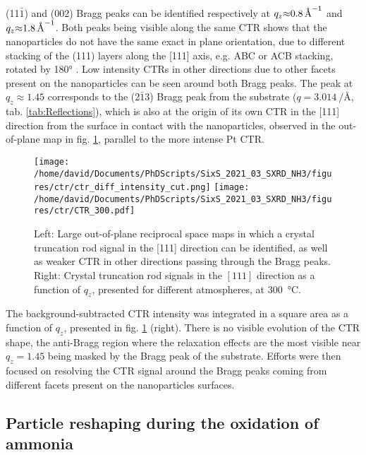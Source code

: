(11$\bar{1}$) and (002) Bragg peaks can be identified respectively at $q_z \qty{\approx0.8}{\per\angstrom}$ and $q_z \qty{\approx1.8}{\per\angstrom}$.
Both peaks being visible along the same CTR shows that the nanoparticles do not have the same exact in plane orientation, due to different stacking of the (111) layers along the [111] axis, e.g. ABC or ACB stacking, rotated by \ang{180} \parencite{JONES2019}.
Low intensity CTRs in other directions due to other facets present on the nanoparticles can be seen around both Bragg peaks.
The peak at $q_z\approx1.45$ corresponds to the (2$\bar{1}$3) Bragg peak from the  substrate ($q = \qty{3.014}{\per\angstrom}$, tab. \ref{tab:Reflections}), which is also at the origin of its own CTR in the [111] direction from the surface in contact with the nanoparticles, observed in the out-of-plane map in fig. \ref{fig:2DCTR111Particles}, parallel to the more intense Pt CTR.

\begin{figure}[!htb]
    \centering
    \texttt{[image: /home/david/Documents/PhDScripts/SixS\_2021\_03\_SXRD\_NH3/figures/ctr/ctr\_diff\_intensity\_cut.png]}
    \texttt{[image: /home/david/Documents/PhDScripts/SixS\_2021\_03\_SXRD\_NH3/figures/ctr/CTR\_300.pdf]}
    \caption{
        Left: Large out-of-plane reciprocal space maps in which a crystal truncation rod signal in the [111] direction can be identified, as well as weaker CTR in other directions passing through the Bragg peaks.
        Right: Crystal truncation rod signals in the $[111]$ direction as a function of $q_z$, presented for different atmospheres, at \qty{300}{\degreeCelsius}.
    }
    \label{fig:2DCTR111Particles}
\end{figure}

The background-subtracted CTR intensity was integrated in a square area as a function of $q_z$, presented in fig. \ref{fig:2DCTR111Particles} (right).
There is no visible evolution of the CTR shape, the anti-Bragg region where the relaxation effects are the most visible near $q_z=1.45$ being masked by the Bragg peak of the substrate.
Efforts were then focused on resolving the CTR signal around the Bragg peaks coming from different facets present on the nanoparticles surfaces.

\subsection{Particle reshaping during the oxidation of ammonia}


